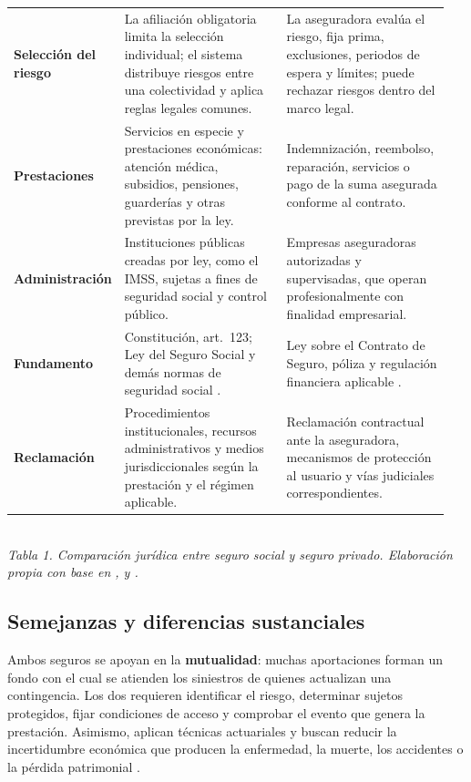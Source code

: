 \documentclass[12pt,letterpaper,oneside]{article}
\begin{document}
\begin{landscape}
{{\begin{tabular}{L{0.17\linewidth} L{0.39\linewidth} L{0.39\linewidth}}
\textbf{Selecci\'on del riesgo} & La afiliaci\'on obligatoria limita la selecci\'on individual; el sistema distribuye riesgos entre una colectividad y aplica reglas legales comunes. & La aseguradora eval\'ua el riesgo, fija prima, exclusiones, periodos de espera y l\'imites; puede rechazar riesgos dentro del marco legal. \\
\textbf{Prestaciones} & Servicios en especie y prestaciones econ\'omicas: atenci\'on m\'edica, subsidios, pensiones, guarder\'ias y otras previstas por la ley. & Indemnizaci\'on, reembolso, reparaci\'on, servicios o pago de la suma asegurada conforme al contrato. \\
\textbf{Administraci\'on} & Instituciones p\'ublicas creadas por ley, como el IMSS, sujetas a fines de seguridad social y control p\'ublico. & Empresas aseguradoras autorizadas y supervisadas, que operan profesionalmente con finalidad empresarial. \\
\textbf{Fundamento} & Constituci\'on, art.~123; Ley del Seguro Social y dem\'as normas de seguridad social \citep{lss2026}. & Ley sobre el Contrato de Seguro, p\'oliza y regulaci\'on financiera aplicable \citep{leyContratoSeguro2026}. \\
\textbf{Reclamaci\'on} & Procedimientos institucionales, recursos administrativos y medios jurisdiccionales seg\'un la prestaci\'on y el r\'egimen aplicable. & Reclamaci\'on contractual ante la aseguradora, mecanismos de protecci\'on al usuario y v\'ias judiciales correspondientes. \\
\bottomrule
\end{tabular}%
}\\[0.30cm]
{\footnotesize\textit{Tabla 1. Comparaci\'on jur\'idica entre seguro social y seguro privado. Elaboraci\'on propia con base en \citet{bricenoRuiz2011}, \citet{lss2026} y \citet{leyContratoSeguro2026}.}}
}
\par
\endgroup
\end{landscape}

\subsection{Semejanzas y diferencias sustanciales}

Ambos seguros se apoyan en la \textbf{mutualidad}: muchas aportaciones forman un fondo con el cual se atienden los siniestros de quienes actualizan una contingencia. Los dos requieren identificar el riesgo, determinar sujetos protegidos, fijar condiciones de acceso y comprobar el evento que genera la prestaci\'on. Asimismo, aplican t\'ecnicas actuariales y buscan reducir la incertidumbre econ\'omica que producen la enfermedad, la muerte, los accidentes o la p\'erdida patrimonial \citep{bricenoRuiz2011,perezSotoCalderon2012}.
\end{document}
